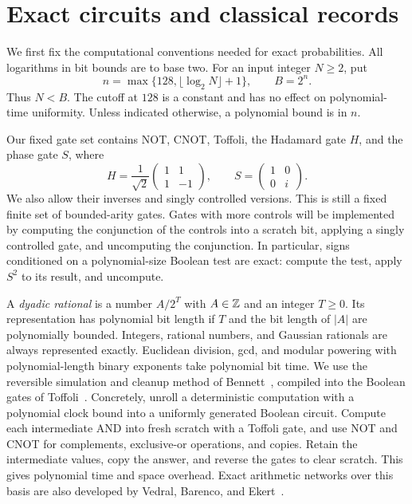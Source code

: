 \section{Exact circuits and classical records}\label{sec:model}

We first fix the computational conventions needed for exact probabilities.
All logarithms in bit bounds are to base two. For an input integer $N\ge2$, put
\begin{equation}\label{eq:parameters-n}
 n=\max\{128,\lfloor\log_2N\rfloor+1\},\qquad B=2^n.
\end{equation}
Thus $N<B$. The cutoff at $128$ is a constant and has no effect on polynomial-time uniformity. Unless indicated otherwise, a polynomial bound is in $n$.

Our fixed gate set contains NOT, CNOT, Toffoli, the Hadamard gate $H$, and the phase gate $S$, where
\[
 H=\frac1{\sqrt2}\begin{pmatrix}1&1\\1&-1\end{pmatrix},
 \qquad S=\begin{pmatrix}1&0\\0&i\end{pmatrix}.
\]
We also allow their inverses and singly controlled versions. This is still a fixed finite set of bounded-arity gates. Gates with more controls will be implemented by computing the conjunction of the controls into a scratch bit, applying a singly controlled gate, and uncomputing the conjunction. In particular, signs conditioned on a polynomial-size Boolean test are exact: compute the test, apply $S^2$ to its result, and uncompute.

A \emph{dyadic rational} is a number $A/2^T$ with $A\in\mathbb Z$ and an integer $T\ge0$. Its representation has polynomial bit length if $T$ and the bit length of $|A|$ are polynomially bounded. Integers, rational numbers, and Gaussian rationals are always represented exactly. Euclidean division, gcd, and modular powering with polynomial-length binary exponents take polynomial bit time. We use the reversible simulation and cleanup method of Bennett~\cite{Bennett}, compiled into the Boolean gates of Toffoli~\cite[Section~5]{Toffoli}. Concretely, unroll a deterministic computation with a polynomial clock bound into a uniformly generated Boolean circuit. Compute each intermediate AND into fresh scratch with a Toffoli gate, and use NOT and CNOT for complements, exclusive-or operations, and copies. Retain the intermediate values, copy the answer, and reverse the gates to clear scratch. This gives polynomial time and space overhead. Exact arithmetic networks over this basis are also developed by Vedral, Barenco, and Ekert~\cite{VBE}.

